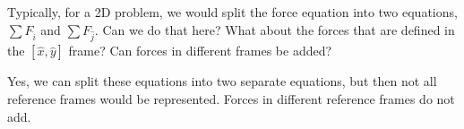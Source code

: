 Typically, for a 2D problem, we would split the force equation into two equations, $\sum F_{\hat{i}}$ and $\sum F_{\hat{j}}$. Can we do that here? What about the forces that are defined in the $\left[\hat{x}, \hat{y} \right]$ frame? Can forces in different frames be added?

\begin{solution}
    Yes, we can split these equations into two separate equations, but then not all reference frames would be represented. Forces in different reference frames do not add.
\end{solution}